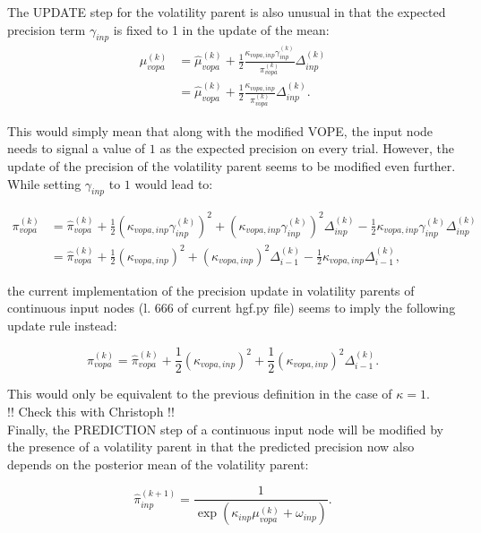 The \textsf{UPDATE step} for the volatility parent is also unusual in that the expected precision term $\gamma_{inp}$ is fixed to 1 in the update of the mean:
\begin{align}
	\mu_{vopa}^{(k)} &= \hat{\mu}_{vopa}^{(k)} 
			+ \frac{1}{2} \frac{\kappa_{vopa,inp} \gamma_{inp}^{(k)}}{\pi_{vopa}^{(k)}} \Delta_{inp}^{(k)}\\
			&= \hat{\mu}_{vopa}^{(k)} 
			+ \frac{1}{2} \frac{\kappa_{vopa,inp}}{\pi_{vopa}^{(k)}} \Delta_{inp}^{(k)}.
\end{align}

This would simply mean that along with the modified \textsf{VOPE}, the input node needs to signal a value of $1$ as the expected precision on every trial. However, the update of the precision of the volatility parent seems to be modified even further. While setting $\gamma_{inp}$ to $1$ would lead to:

\begin{align}
	\pi_{vopa}^{(k)} &= \hat{\pi}_{vopa}^{(k)} 
			+ \frac{1}{2} (\kappa_{vopa,inp} \gamma_{inp}^{(k)})^2 
			+ (\kappa_{vopa,inp} \gamma_{inp}^{(k)})^2 \Delta_{inp}^{(k)} 
			- \frac{1}{2} \kappa_{vopa,inp} \gamma_{inp}^{(k)} \Delta_{inp}^{(k)}\\
			&= \hat{\pi}_{vopa}^{(k)} 
			+ \frac{1}{2} (\kappa_{vopa,inp})^2 
			+ (\kappa_{vopa,inp})^2 \Delta_{i-1}^{(k)} 
			- \frac{1}{2} \kappa_{vopa,inp} \Delta_{i-1}^{(k)}, 
\end{align}

the current implementation of the precision update in volatility parents of continuous input nodes (l. 666 of current \textsf{hgf.py} file) seems to imply the following update rule instead:

\begin{equation}
	\pi_{vopa}^{(k)} = \hat{\pi}_{vopa}^{(k)} 
			+ \frac{1}{2} (\kappa_{vopa,inp})^2 
			+ \frac{1}{2} (\kappa_{vopa,inp})^2 \Delta_{i-1}^{(k)}.
\end{equation}

This would only be equivalent to the previous definition in the case of $\kappa = 1$.\\
\noindent
!! Check this with Christoph !! \\

Finally, the \textsf{PREDICTION step} of a continuous input node will be modified by the presence of a volatility parent in that the predicted precision now also depends on the posterior mean of the volatility parent:

\begin{equation}
	\hat{\pi}_{inp}^{(k+1)} = \frac{1}{\exp(\kappa_{inp} \mu_{vopa}^{(k)} + \omega_{inp})}.
\end{equation}


